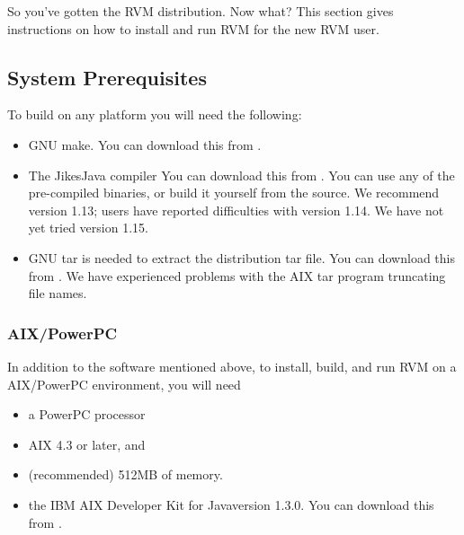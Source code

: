 So you've gotten the RVM distribution.  Now what?  This section gives
instructions on how to install and run RVM for the new RVM user.

\subsection{System Prerequisites}
To build on any platform you will need the following:
\begin{itemize}
\item GNU make. You can download this from
\xlink{{\tt \gnuMakeURL}} {\gnuMakeURL}.

\item The Jikes\trademark Java compiler 
You can download this from
\xlink{{\tt \jikesURL}} {\jikesURL}.
You can use any of the pre-compiled binaries, or build it yourself from the
source. We recommend version 1.13; users have reported difficulties with 
version 1.14.  We have not yet tried version 1.15.

\item GNU tar is needed to extract the distribution tar file.  
You can download this from
\xlink{{\tt \gnuTarURL}} {\gnuTarURL}.
We have
experienced problems with the AIX tar program truncating file names.

\end{itemize}

\subsubsection{AIX/PowerPC}
In addition to the software mentioned above, to install, build, and
run RVM on a AIX/PowerPC environment, 
you will need 
\begin{itemize}
\item a PowerPC processor
\item AIX 4.3 or later, and
\item (recommended) 512MB of memory.
\item the IBM AIX Developer Kit for Java\trademark version 1.3.0.  You can download this from
\xlink{{\tt \AIXJdkURL}} {\AIXJdkURL}.
\end{itemize}

